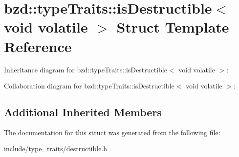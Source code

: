 \hypertarget{structbzd_1_1typeTraits_1_1isDestructible_3_01void_01volatile_01_4}{}\section{bzd\+:\+:type\+Traits\+:\+:is\+Destructible$<$ void volatile $>$ Struct Template Reference}
\label{structbzd_1_1typeTraits_1_1isDestructible_3_01void_01volatile_01_4}


Inheritance diagram for bzd\+:\+:type\+Traits\+:\+:is\+Destructible$<$ void volatile $>$\+:


Collaboration diagram for bzd\+:\+:type\+Traits\+:\+:is\+Destructible$<$ void volatile $>$\+:
\subsection*{Additional Inherited Members}


The documentation for this struct was generated from the following file\+:\begin{DoxyCompactItemize}
\item 
include/type\+\_\+traits/destructible.\+h\end{DoxyCompactItemize}
